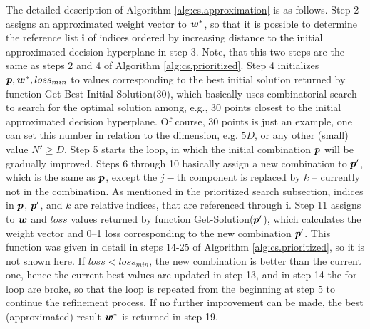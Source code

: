 The detailed description of Algorithm \ref{alg:cs.approximation} is as follows. Step 2 assigns an approximated weight vector to $\boldsymbol{w}^*$, so that it is possible to determine the reference list $\boldsymbol{i}$ of indices ordered by increasing distance to the initial approximated decision hyperplane in step 3. Note, that this two steps are the same as steps 2 and 4 of Algorithm \ref{alg:cs.prioritized}. Step 4 initializes $\boldsymbol{p}, \boldsymbol{w}^*, loss_{min}$ to values corresponding to the best initial solution returned by function {\sc Get-Best-Initial-Solution(30)}, which basically uses combinatorial search to search for the optimal solution among, e.g., 30 points closest to the initial approximated decision hyperplane. Of course, 30 points is just an example, one can set this number in relation to the dimension, e.g. $5D$, or any other (small) value $N' \geq D$. Step 5 starts the loop, in which the initial combination $\boldsymbol{p}$ will be gradually improved. Steps 6 through 10 basically assign a new combination to $\boldsymbol{p}'$, which is the same as $\boldsymbol{p}$, except the $j-$th component is replaced by $k$ -- currently not in the combination. As mentioned in the prioritized search subsection, indices in $\boldsymbol{p}$, $\boldsymbol{p}'$, and $k$ are relative indices, that are referenced through $\boldsymbol{i}$. Step 11 assigns to $\boldsymbol{w}$ and $loss$ values returned by function {\sc Get-Solution($\boldsymbol{p}'$)}, which calculates the weight vector and 0--1 loss corresponding to the new combination $\boldsymbol{p}'$. This function was given in detail in steps 14-25 of Algorithm \ref{alg:cs.prioritized}, so it is not shown here. If $loss < loss_{min}$, the new combination is better than the current one, hence the current best values are updated in step 13, and in step 14 the for loop are broke, so that the loop is repeated from the beginning at step 5 to continue the refinement process. If no further improvement can be made, the best (approximated) result $\boldsymbol{w}^*$ is returned in step 19. 

